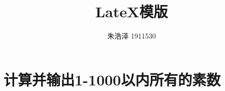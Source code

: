 \documentclass{article}
\begin{document}
\title{LateX模版}
\author{朱浩泽 1911530}
\maketitle
\section{计算并输出1-1000以内所有的素数}
\large
\end{document}
